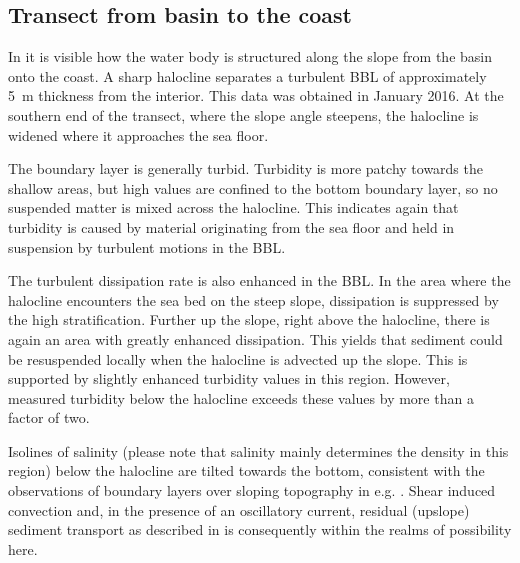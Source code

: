 \subsection{Transect from basin to the coast}

In  it is visible how the water body is structured along the 
slope from the basin onto the coast. A sharp halocline separates a turbulent 
BBL of approximately 5~m thickness from the interior. This 
data was obtained in January 2016. At the southern end of the transect, where 
the slope angle steepens, the halocline is widened where it approaches the sea 
floor. 

The boundary layer is generally turbid. Turbidity is more patchy towards the 
shallow areas, but high values are confined to the bottom boundary layer, 
so no suspended matter is mixed across the halocline. This indicates again that 
turbidity is caused by material originating from the sea floor and held in 
suspension by turbulent motions in the BBL.

The turbulent dissipation rate is also enhanced in the BBL. In the area where 
the halocline encounters the sea bed on the steep slope, dissipation is 
suppressed by the high stratification. Further up the slope, right above the 
halocline, there is again an area with greatly enhanced dissipation. This 
yields that sediment could be resuspended locally when the halocline is 
advected up the slope. This is supported by slightly enhanced turbidity values 
in this region. However, measured turbidity below the halocline exceeds these 
values by more than a factor of two.

Isolines of salinity (please note that salinity mainly determines the density 
in this region) below the halocline are tilted towards the bottom, consistent 
with the observations of boundary layers over sloping topography in e.g. 
\cite{Lorkeetal2005a}. Shear induced convection and, in the presence of an 
oscillatory current, residual (upslope) sediment transport as described in 
\cite{schulzumlauf2016} is consequently within the realms of possibility here.

